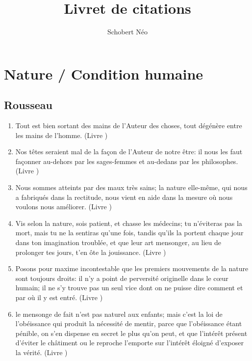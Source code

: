 \documentclass[a4paper, 11pt, hidelinks]{article}
\newcommand{\rb}[1]{\Romanbar{#1}}
\begin{document}
\newcommand{\grad}[1]{\vv{grad}#1}


\title{Livret de citations}
\author{Schobert Néo}

\maketitle

\tableofcontents


\newpage














\section{Nature / Condition humaine}



\subsection{Rousseau}


\begin{enumerate}
    \item Tout est bien sortant des mains de l'Auteur des choses, tout dégénère entre les mains de l'homme. (Livre \rb{1})
    \item Nos têtes seraient mal de la façon de l'Auteur de notre être: il nous les faut façonner au-dehors par les sages-femmes et au-dedans par les philosophes. (Livre \rb{1})
    \item Nous sommes atteints par des maux très sains; la nature elle-même, qui nous a fabriqués dans la rectitude, nous vient en aide dans la mesure où nous voulons nous améliorer. (Livre \rb{2})
    \item Vis selon la nature, sois patient, et chasse les médecins; tu n'éviteras pas la mort, mais tu ne la sentiras qu'une fois, tandis qu'ils la portent chaque jour dans ton imagination troublée, et que leur art mensonger, au lieu de prolonger tes jours, t'en ôte la jouissance. (Livre \rb{2})
    \item Posons pour maxime incontestable que les premiers mouvements de la nature sont toujours droits: il n'y a point de perversité originelle dans le c\oe ur humain; il ne s'y trouve pas un seul vice dont on ne puisse dire comment et par où il y est entré. (Livre \rb{2})
    \item le mensonge de fait n'est pas naturel aux enfants; mais c'est la loi de l'obéissance qui produit la nécessité de mentir, parce que l'obéissance étant pénible, on s'en dispense en secret le plus qu'on peut, et que l'intérêt présent d'éviter le châtiment ou le reproche l'emporte sur l'intérêt éloigné d'exposer la vérité. (Livre \rb{2}) 
\end{enumerate}
\end{document}
